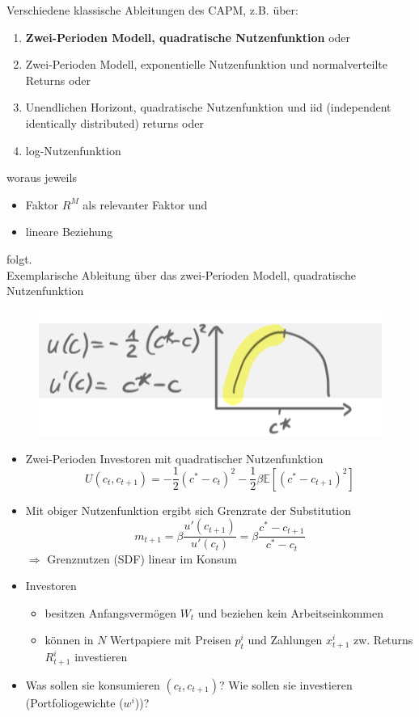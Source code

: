 \documentclass[12pt]{extreport} %
\theoremstyle{named}
\theoremstyle{nnamed}
\theoremstyle{itshape}
\theoremstyle{normal}
\begin{document}
Verschiedene klassische Ableitungen des CAPM, z.B. über:
\begin{enumerate}
	\item \textbf{Zwei-Perioden Modell, quadratische Nutzenfunktion} oder
	\item Zwei-Perioden Modell, exponentielle Nutzenfunktion und normalverteilte Returns oder
	\item Unendlichen Horizont, quadratische Nutzenfunktion und iid (independent identically distributed) returns oder
	\item log-Nutzenfunktion
\end{enumerate}
woraus jeweils
\begin{itemize}
	\item Faktor $R^M$ als relevanter Faktor und
	\item lineare Beziehung
\end{itemize}
folgt. ~\\

Exemplarische Ableitung über das zwei-Perioden Modell, quadratische Nutzenfunktion
\begin{figure}[h!] \centering
	\includegraphics[scale=0.75]{img/p83}
\end{figure}
\begin{itemize}
	\item Zwei-Perioden Investoren mit quadratischer Nutzenfunktion
		$$ U(c_t, c_{t+1}) = -\frac{1}{2} \left( c^* - c_t \right)^2 - \frac{1}{2} \beta \mathbb{E} \left[ \left( c^* - c_{t+1} \right)^2 \right] $$
	\item Mit obiger Nutzenfunktion ergibt sich Grenzrate der Substitution
		$$ m_{t+1} = \beta \frac{u'(c_{t+1})}{u'(c_t)} = \beta \frac{c^* - c_{t+1}}{c^* - c_t} $$
		$\Rightarrow$ Grenznutzen (SDF) linear im Konsum
	\item Investoren
		\begin{itemize}
			\item besitzen Anfangsvermögen $W_t$ und beziehen kein Arbeitseinkommen
			\item können in $N$ Wertpapiere mit Preisen $p_t^i$ und Zahlungen $x_{t+1}^i$ zw. Returns $R_{t+1}^i$ investieren
		\end{itemize}
	\item Was sollen sie konsumieren $(c_t, c_{t+1})$? Wie sollen sie investieren (Portfoliogewichte ($w^i$))?
\end{itemize}
\end{document}
